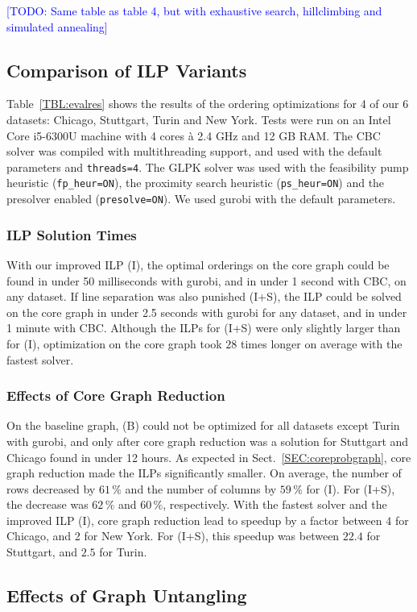 \documentclass[format=acmsmall, review=false, screen=true]{acmart}
\newcommand\TODO[1]{\textcolor{blue}{\small [TODO: #1]}}
\begin{document}
\TODO{Same table as table 4, but with exhaustive search, hillclimbing and simulated annealing}

\subsection{Comparison of ILP Variants}

Table~\ref{TBL:evalres} shows the results of the ordering optimizations for 4 of our 6 datasets: Chicago, Stuttgart, Turin and New York. Tests were run on an Intel Core i5-6300U machine with 4 cores \`{a} 2.4 GHz and 12 GB RAM.
The CBC solver was compiled with multithreading support, and used with the default parameters and \texttt{threads=4}.
The GLPK solver was used with the feasibility pump heuristic (\texttt{fp\_heur=ON}), the proximity search heuristic (\texttt{ps\_heur=ON}) and the presolver enabled (\texttt{presolve=ON}). We used gurobi with the default parameters.
\subsubsection{ILP Solution Times} With our improved ILP (I), the optimal orderings on the core graph could be found in under 50 milliseconds with gurobi, and in under 1 second with CBC, on any dataset. If line separation was also punished (I+S), the ILP could be solved on the core graph in under 2.5 seconds with gurobi for any dataset, and in under 1 minute with CBC. Although the ILPs for (I+S) were only slightly larger than for (I), optimization on the core graph took $28$ times longer on average with the fastest solver.
\subsubsection{Effects of Core Graph Reduction} On the baseline graph, (B) could not be optimized for all datasets except Turin with gurobi, and only after core graph reduction was a solution for Stuttgart and Chicago found in under 12 hours. As expected in Sect.~\ref{SEC:coreprobgraph}, core graph reduction made the ILPs significantly smaller. On average, the number of rows decreased by $61\,\%$ and the number of columns by $59\,\%$ for (I). For (I+S), the decrease was $62\,\%$ and $60\,\%$, respectively. With the fastest solver and the improved ILP (I), core graph reduction lead to speedup by a factor between $4$ for Chicago, and 2 for New York. For (I+S), this speedup was between $22.4$ for Stuttgart, and $2.5$ for Turin.

\subsection{Effects of Graph Untangling}
\end{document}
